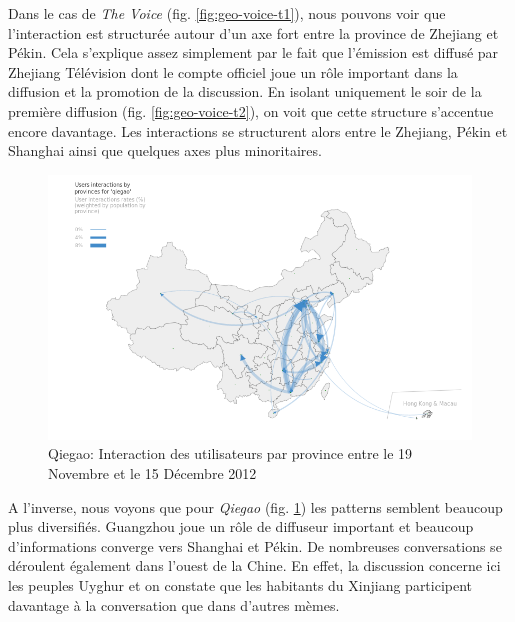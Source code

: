 Dans le cas de \textit{The Voice} (fig. \ref{fig:geo-voice-t1}), nous pouvons voir que l{\textquoteright}interaction est structurée autour d{\textquoteright}un axe fort entre la province de Zhejiang et Pékin. Cela s{\textquoteright}explique assez simplement par le fait que l{\textquoteright}émission est diffusé par Zhejiang Télévision dont le compte officiel joue un r\^ole important dans la diffusion et la promotion de la discussion. En isolant uniquement le soir de la première diffusion (fig. \ref{fig:geo-voice-t2}), on voit que cette structure s{\textquoteright}accentue encore davantage. Les interactions se structurent alors entre le Zhejiang, Pékin et Shanghai ainsi que quelques axes plus minoritaires.

\begin{figure}[h!]
    \centering
    \includegraphics[scale=.35]{figures/chap4/chapitre4-img21.png}
    \caption{
      Qiegao: Interaction des utilisateurs par province entre le 19 Novembre et le 15 Décembre 2012
    }
    \label{fig:geo-qiegao-t0}
\end{figure}

A l{\textquoteright}inverse, nous voyons que pour \textit{Qiegao} (fig. \ref{fig:geo-qiegao-t0}) les patterns semblent beaucoup plus diversifiés. Guangzhou joue un r\^ole de diffuseur important et beaucoup d{\textquoteright}informations converge vers Shanghai et Pékin. De nombreuses conversations se déroulent également dans l{\textquoteright}ouest de la Chine. En effet, la discussion concerne ici les peuples Uyghur et on constate que les habitants du Xinjiang participent davantage \`a la conversation que dans d{\textquoteright}autres mèmes.  

